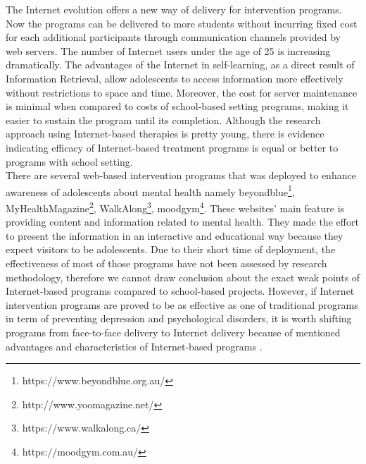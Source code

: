 The Internet evolution offers a new way of delivery for intervention programs. Now the programs can be delivered to more students without incurring fixed cost for each additional participants through communication channels provided by web servers. The number of Internet users under the age of 25 is increasing dramatically. The advantages of the Internet in self-learning, as a direct result of Information Retrieval, allow adolescents to access information more effectively without restrictions to space and time. Moreover, the cost for server maintenance is minimal when compared to costs of school-based setting programs, making it easier to sustain the program until its completion. Although the research approach using Internet-based therapies is pretty young, there is evidence indicating efficacy of Internet-based treatment programs is equal or better to programs with school setting.\\
There are several web-based intervention programs that was deployed to enhance awareness of adolescents about mental health namely beyondblue\footnote{https://www.beyondblue.org.au/}, MyHealthMagazine\footnote{http://www.yoomagazine.net/}, WalkAlong\footnote{https://www.walkalong.ca/}, moodgym\footnote{https://moodgym.com.au/}. These websites' main feature is providing content and information related to mental health. They made the effort to present the information in an interactive and educational way because they expect visitors to be adolescents. Due to their short time of deployment, the effectiveness of most of those programs have not been assessed by research methodology, therefore we cannot draw conclusion about the exact weak points of Internet-based programs compared to school-based projects. However, if Internet intervention programs are proved to be as effective as one of traditional programs in term of preventing depression and psychological disorders, it is worth shifting programs from face-to-face delivery to Internet delivery because of mentioned advantages and characteristics of Internet-based programs \cite{Huen2016}.\\

